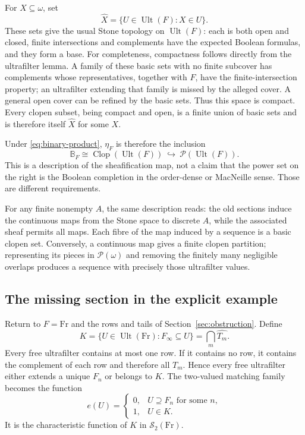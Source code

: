 \documentclass[11pt,letterpaper]{article}
\theoremstyle{definition}
\theoremstyle{remark}
\newcommand{\om}{\omega}
\newcommand{\Fr}{\mathrm{Fr}}
\newcommand{\Pow}{\mathcal P}
\newcommand{\Ult}{\operatorname{Ult}}
\newcommand{\B}{\mathbb B}
\begin{document}
For $X\subseteq\om$, set
\[
 \widehat X=\{U\in\Ult(F):X\in U\}.
\]
These sets give the usual Stone topology on $\Ult(F)$: each is both
open and closed, finite intersections and complements have the expected
Boolean formulas, and they form a base. For completeness, compactness
follows directly from the ultrafilter lemma. A family of these basic
sets with no finite subcover has complements whose representatives,
together with $F$, have the finite-intersection property; an ultrafilter
extending that family is missed by the alleged cover. A general open
cover can be refined by the basic sets. Thus this space is compact.
Every clopen subset, being compact and open, is a finite union of basic
sets and is therefore itself $\widehat X$ for some $X$.

Under \eqref{eq:binary-product}, $\eta_F$ is therefore the inclusion
\begin{equation}\label{eq:stone}
 \B_F\cong\operatorname{Clop}(\Ult(F))
 \ \hookrightarrow\ \Pow(\Ult(F)).
\end{equation}
This is a description of the sheafification map, not a claim that the
power set on the right is the Boolean completion in the order-dense or
MacNeille sense. Those are different requirements.

For any finite nonempty $A$, the same description reads: the old
sections induce the continuous maps from the Stone space to discrete
$A$, while the associated sheaf permits all maps. Each fibre of the
map induced by a sequence is a basic clopen set. Conversely, a
continuous map gives a finite clopen partition; representing its pieces
in $\Pow(\om)$ and removing the finitely many negligible overlaps
produces a sequence with precisely those ultrafilter values.

\subsection{The missing section in the explicit example}
Return to $F=\Fr$ and the rows and tails of
Section~\ref{sec:obstruction}. Define
\begin{equation}\label{eq:K}
 K=\{U\in\Ult(\Fr):F_\infty\subseteq U\}
  =\bigcap_m\widehat{T_m}.
\end{equation}
Every free ultrafilter contains at most one row. If it contains no row,
it contains the complement of each row and therefore all $T_m$.
Hence every free ultrafilter either extends a unique $F_n$ or belongs
to $K$. The two-valued matching family becomes the function
\[
 e(U)=
 \begin{cases}
  0,&U\supseteq F_n\text{ for some }n,\\
  1,&U\in K.
 \end{cases}
\]
It is the characteristic function of $K$ in $\mathscr S_2(\Fr)$.
\end{document}
